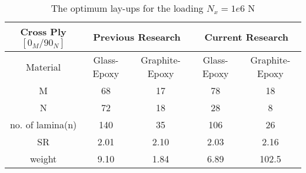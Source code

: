 \begin{table*}[!htb]
\caption{The optimum lay-ups for the loading $N_x=1e6$ N}
\centering
\begin{adjustbox}{width=1\textwidth}
\begin{tabular}{c|cc|cc}
	\toprule
	Cross Ply $[0_M/90_N]$         & \multicolumn{2}{c}{Previous Research} & \multicolumn{2}{c}{Current Research} \\
	\midrule																								  
	 Material       &  Glass-Epoxy & Graphite-Epoxy  & Glass-Epoxy & Graphite-Epoxy      \\ 
	      M         &  68          &    17           &  78		    &  18             \\
	      N         &  72          &    18           &  28		    &  8              \\
no. of lamina(n)    &  140         &    35           &  106	    &  26                     \\
         SR         &  2.01        &    2.10         &  2.03	    &  2.16            \\
     weight         &  9.10        &    1.84         &  6.89	    &  102.5           \\
	\bottomrule
\end{tabular}
\end{adjustbox}
\label{tab:comparsion}
\end{table*}
